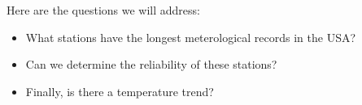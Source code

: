 \documentclass{article}\usepackage[]{graphicx}\usepackage[]{xcolor}
\begin{document}
Here are the questions we will address: 

\begin{itemize}
  \item What stations have the longest meterological records in the USA?
  \item Can we determine the reliability of these stations?
  \item Finally, is there a temperature trend?
\end{itemize}









\end{document}
